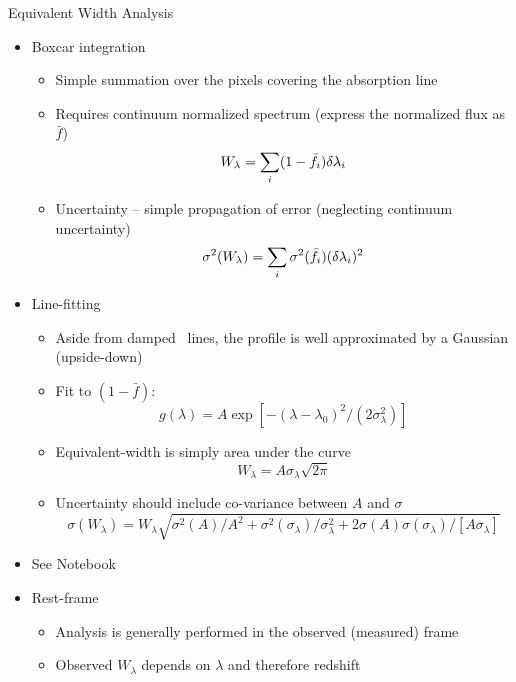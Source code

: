 \documentclass[12pt,letterpaper]{article}
\begin{document}
\begin{Aenumerate}
{\bf \item Equivalent Width Analysis}
	\begin{itemize}
	\item Boxcar integration
		\begin{itemize}
		\item Simple summation over the pixels covering the absorption line
		\item Requires continuum normalized spectrum 
		(express the normalized flux as $\bar f$)
		\begin{equation}
		W_\lambda = \sum\limits_i (1- \bar f_i) \delta\lambda_i
		\end{equation}
		\item Uncertainty -- simple propagation of error (neglecting
		continuum uncertainty)
		\begin{equation}
		\sigma^2(W_\lambda) = \sum\limits_i \sigma^2(\bar f_i) (\delta\lambda_i)^2
		\label{eqn:sigEW}
		\end{equation}
		\end{itemize}
	\item Line-fitting
		\begin{itemize}
		\item Aside from damped \lya\ lines, the profile is well
		approximated by a Gaussian  (upside-down)
		\item Fit to $(1-\bar f)$:
		\begin{equation}
		g(\lambda) = A \exp[- (\lambda-\lambda_0)^2 / (2 \sigma_\lambda^2)]
		\end{equation}
		\item Equivalent-width is simply area under the curve
		\begin{equation}
		W_\lambda = A \sigma_\lambda \sqrt{2 \pi}
		\end{equation}
		\item Uncertainty should include co-variance between $A$ and $\sigma$
		\begin{equation}
		\sigma(W_\lambda) = W_\lambda \sqrt{\sigma^2(A)/A^2 +
		\sigma^2(\sigma_\lambda)/\sigma_\lambda^2 + 2 \sigma(A)\sigma(\sigma_\lambda)/[A \sigma_\lambda]}
		\end{equation}
		\end{itemize}
	\item See Notebook
	\item Rest-frame
		\begin{itemize}
		\item Analysis is generally performed in the observed (measured) frame
		\item Observed $W_\lambda$ depends on $\lambda$ and therefore redshift

\end{itemize}
\end{itemize}
\end{Aenumerate}
\end{document}
